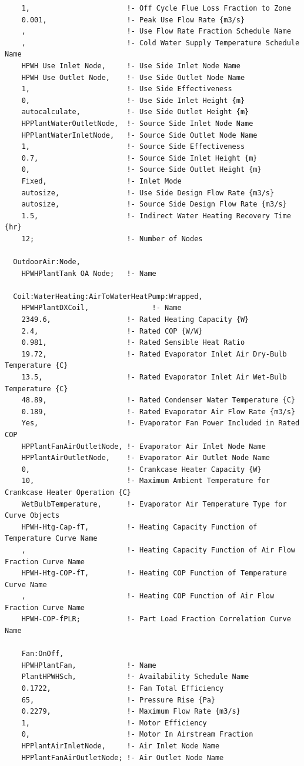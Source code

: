 \begin{lstlisting}
    1,                       !- Off Cycle Flue Loss Fraction to Zone
    0.001,                   !- Peak Use Flow Rate {m3/s}
    ,                        !- Use Flow Rate Fraction Schedule Name
    ,                        !- Cold Water Supply Temperature Schedule Name
    HPWH Use Inlet Node,     !- Use Side Inlet Node Name
    HPWH Use Outlet Node,    !- Use Side Outlet Node Name
    1,                       !- Use Side Effectiveness
    0,                       !- Use Side Inlet Height {m}
    autocalculate,           !- Use Side Outlet Height {m}
    HPPlantWaterOutletNode,  !- Source Side Inlet Node Name
    HPPlantWaterInletNode,   !- Source Side Outlet Node Name
    1,                       !- Source Side Effectiveness
    0.7,                     !- Source Side Inlet Height {m}
    0,                       !- Source Side Outlet Height {m}
    Fixed,                   !- Inlet Mode
    autosize,                !- Use Side Design Flow Rate {m3/s}
    autosize,                !- Source Side Design Flow Rate {m3/s}
    1.5,                     !- Indirect Water Heating Recovery Time {hr}
    12;                      !- Number of Nodes

  OutdoorAir:Node,
    HPWHPlantTank OA Node;   !- Name

  Coil:WaterHeating:AirToWaterHeatPump:Wrapped,
    HPWHPlantDXCoil,               !- Name
    2349.6,                  !- Rated Heating Capacity {W}
    2.4,                     !- Rated COP {W/W}
    0.981,                   !- Rated Sensible Heat Ratio
    19.72,                   !- Rated Evaporator Inlet Air Dry-Bulb Temperature {C}
    13.5,                    !- Rated Evaporator Inlet Air Wet-Bulb Temperature {C}
    48.89,                   !- Rated Condenser Water Temperature {C}
    0.189,                   !- Rated Evaporator Air Flow Rate {m3/s}
    Yes,                     !- Evaporator Fan Power Included in Rated COP
    HPPlantFanAirOutletNode, !- Evaporator Air Inlet Node Name
    HPPlantAirOutletNode,    !- Evaporator Air Outlet Node Name
    0,                       !- Crankcase Heater Capacity {W}
    10,                      !- Maximum Ambient Temperature for Crankcase Heater Operation {C}
    WetBulbTemperature,      !- Evaporator Air Temperature Type for Curve Objects
    HPWH-Htg-Cap-fT,         !- Heating Capacity Function of Temperature Curve Name
    ,                        !- Heating Capacity Function of Air Flow Fraction Curve Name
    HPWH-Htg-COP-fT,         !- Heating COP Function of Temperature Curve Name
    ,                        !- Heating COP Function of Air Flow Fraction Curve Name
    HPWH-COP-fPLR;           !- Part Load Fraction Correlation Curve Name

    Fan:OnOff,
    HPWHPlantFan,            !- Name
    PlantHPWHSch,            !- Availability Schedule Name
    0.1722,                  !- Fan Total Efficiency
    65,                      !- Pressure Rise {Pa}
    0.2279,                  !- Maximum Flow Rate {m3/s}
    1,                       !- Motor Efficiency
    0,                       !- Motor In Airstream Fraction
    HPPlantAirInletNode,     !- Air Inlet Node Name
    HPPlantFanAirOutletNode; !- Air Outlet Node Name
\end{lstlisting}

